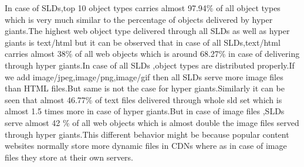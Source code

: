 In case of SLDs,top 10 object types carries almost 97.94\% of all object types  which is very much similar to the percentage of objects delivered by hyper giants.The highest web object type delivered through all SLDs as well as hyper giants is text/html but it can be observed that in case of all SLDs,text/html carries almost 38\% of all web objects which is around 68.27\% in case of delivering through hyper giants.In case of all SLDs ,object types are distributed properly.If we add image/jpeg,image/png,image/gif then all SLDs serve more image files than HTML files.But same is not the case for hyper giants.Similarly it can be seen that almost 46.77\% of text files delivered through whole sld set which is almost 1.5 times more in case of hyper giants.But in case of image files ,SLDs serve almost 42 \% of all web objects which is almost double the image files served through hyper giants.This different behavior might be because popular content websites normally store more dynamic files in CDNs where as in case of image files they store at their own servers.

